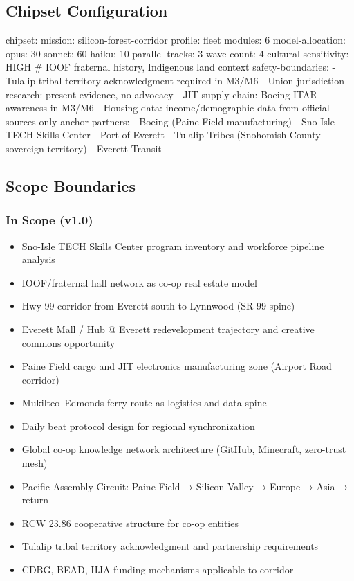 \documentclass[11pt,letterpaper]{article}
\begin{document}
\subsection{Chipset Configuration}

\begin{asciibox}
chipset:
  mission: silicon-forest-corridor
  profile: fleet
  modules: 6
  model-allocation:
    opus: 30%
    sonnet: 60%
    haiku: 10%
  parallel-tracks: 3
  wave-count: 4
  cultural-sensitivity: HIGH  \# IOOF fraternal history, Indigenous land context
  safety-boundaries:
    - Tulalip tribal territory acknowledgment required in M3/M6
    - Union jurisdiction research: present evidence, no advocacy
    - JIT supply chain: Boeing ITAR awareness in M3/M6
    - Housing data: income/demographic data from official sources only
  anchor-partners:
    - Boeing (Paine Field manufacturing)
    - Sno-Isle TECH Skills Center
    - Port of Everett
    - Tulalip Tribes (Snohomish County sovereign territory)
    - Everett Transit
\end{asciibox}

\subsection{Scope Boundaries}

\subsubsection{In Scope (v1.0)}
\begin{itemize}[leftmargin=*]
  \item Sno-Isle TECH Skills Center program inventory and workforce pipeline analysis
  \item IOOF/fraternal hall network as co-op real estate model
  \item Hwy 99 corridor from Everett south to Lynnwood (SR 99 spine)
  \item Everett Mall / Hub @ Everett redevelopment trajectory and creative commons opportunity
  \item Paine Field cargo and JIT electronics manufacturing zone (Airport Road corridor)
  \item Mukilteo--Edmonds ferry route as logistics and data spine
  \item Daily beat protocol design for regional synchronization
  \item Global co-op knowledge network architecture (GitHub, Minecraft, zero-trust mesh)
  \item Pacific Assembly Circuit: Paine Field → Silicon Valley → Europe → Asia → return
  \item RCW 23.86 cooperative structure for co-op entities
  \item Tulalip tribal territory acknowledgment and partnership requirements
  \item CDBG, BEAD, IIJA funding mechanisms applicable to corridor
\end{itemize}
\end{document}
